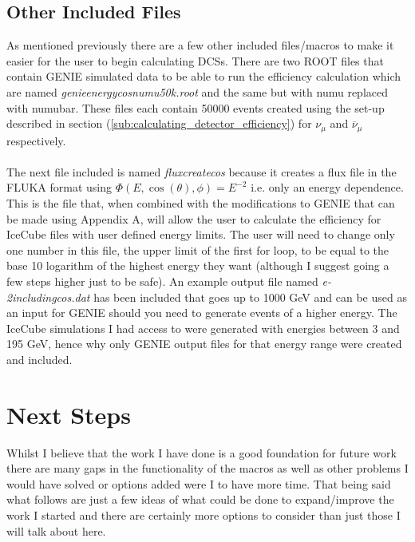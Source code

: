 \documentclass[12pt]{article}
\numberwithin{equation}{section}
\numberwithin{figure}{section}
\begin{document}
\subsection{Other Included Files} %
\label{sub:other_included_code}
As mentioned previously there are a few other included files/macros to make it easier for the user to begin calculating DCSs. There are two ROOT files that contain GENIE simulated data to be able to run the efficiency calculation which are named \emph{genie\textunderscore energy\textunderscore cos\textunderscore numu\textunderscore 50k.root} and the same but with numu replaced with numubar. These files each contain 50000 events created using the set-up described in section (\ref{sub:calculating_detector_efficiency}) for $\nu_\mu$ and $\overline{\nu}_{\mu}$ respectively.\\
\\
The next file included is named \emph{flux\textunderscore create\textunderscore cos} because it creates a flux file in the FLUKA format using $\Phi(E,\cos(\theta),\phi) = E^{-2}$ i.e. only an energy dependence. This is the file that, when combined with the modifications to GENIE that can be made using Appendix A, will allow the user to calculate the efficiency for IceCube files with user defined energy limits. The user will need to change only one number in this file, the upper limit of the first for loop, to be equal to the base 10 logarithm of the highest energy they want (although I suggest going a few steps higher just to be safe). An example output file named \emph{e-2\textunderscore including\textunderscore cos.dat} has been included that goes up to 1000 GeV and can be used as an input for GENIE should you need to generate events of a higher energy. The IceCube simulations I had access to were generated with energies between 3 and 195 GeV, hence why only GENIE output files for that energy range were created and included.\\
%
%
\section{Next Steps} %
\label{sec:next_steps}
Whilst I believe that the work I have done is a good foundation for future work there are many gaps in the functionality of the macros as well as other problems I would have solved or options added were I to have more time. That being said what follows are just a few ideas of what could be done to expand/improve the work I started and there are certainly more options to consider than just those I will talk about here.
%
\end{document}

